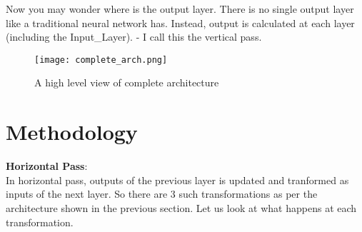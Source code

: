 \documentclass[10pt,a4paper,Times new roman]{report}
\begin{document}
Now you may wonder where is the output layer. There is no single output layer like a traditional neural network has. Instead, output is calculated at each layer (including the Input\_Layer). - I call this the vertical pass. 

\begin{figure}[H]
	\centering
	\caption{A high level view of complete architecture}
	\label{complete_arch}
	\texttt{[image: complete\_arch.png]}
\end{figure}

\section{Methodology}

\textbf{Horizontal Pass}:\\

In horizontal pass, outputs of the previous layer is updated and tranformed as inputs of the next layer. So there are 3 such transformations as per the architecture shown in the previous section. Let us look at what happens at each transformation. 
 
\end{document}

